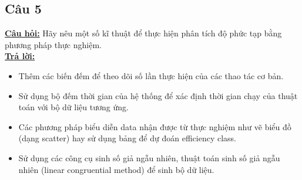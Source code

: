 \documentclass[a4paper 14pt]{extarticle}
\begin{document}
\begin{flushleft}
		\subsection{Câu 5}
		\underline{\textbf{Câu hỏi:}} Hãy nêu một số kĩ thuật để thực hiện phân tích độ phức tạp bằng phương pháp thực nghiệm. \\
		\underline{\textbf{Trả lời:}}  \\
		\begin{itemize}
			\item Thêm các biến đếm để theo dõi số lần thực hiện của các thao tác cơ bản.
			\item Sử dụng bộ đếm thời gian của hệ thống để xác định thời gian chạy của thuật toán với bộ dữ liệu tương ứng.
			\item Các phương pháp biểu diễn data nhận được từ thực nghiệm như vẽ biểu đồ (dạng scatter) hay sử dụng bảng để dự đoán efficiency class.
			\item Sử dụng các công cụ sinh số giả ngẫu nhiên, thuật toán sinh số giả ngẫu nhiên (linear congruential method) để sinh bộ dữ liệu.
		\end{itemize}
	
		
	\end{flushleft}
\end{document}
